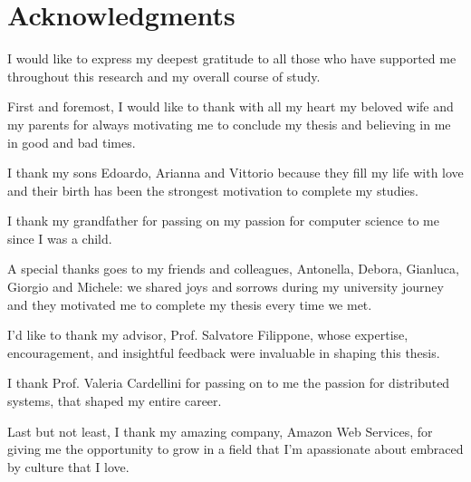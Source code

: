 


\chapter*{Acknowledgments}

I would like to express my deepest gratitude to all those who have supported me throughout this research and my overall course of study.

First and foremost, I would like to thank with all my heart my beloved wife and my parents for always motivating me to conclude my thesis and believing in me in good and bad times.

I thank my sons Edoardo, Arianna and Vittorio because they fill my life with love and their birth has been the strongest motivation to complete my studies.

I thank my grandfather for passing on my passion for computer science to me since I was a child.

A special thanks goes to my friends and colleagues, Antonella, Debora, Gianluca, Giorgio and Michele: we shared joys and sorrows during my university journey and they motivated me to complete my thesis every time we met.

I'd like to thank my advisor, Prof. Salvatore Filippone, whose expertise, encouragement, and insightful feedback were invaluable in shaping this thesis.

I thank Prof. Valeria Cardellini for passing on to me the passion for distributed systems, that shaped my entire career.

Last but not least, I thank my amazing company, Amazon Web Services, for giving me the opportunity to grow in a field that I'm apassionate about embraced by culture that I love.
